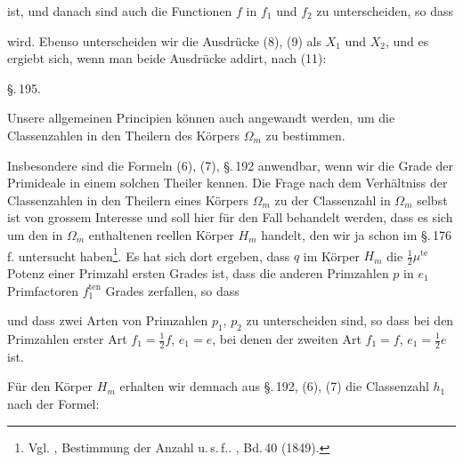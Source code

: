 ist, und danach sind auch die Functionen $f$ in $f_1$ und $f_2$ zu
unterscheiden, so dass

wird. Ebenso unterscheiden wir die Ausdrücke (8), (9) als $X_1$
und $X_2$, und es ergiebt sich, wenn man beide Ausdrücke addirt,
nach (11):

\begin{center}
\S.\,195.\\[4pt]
\end{center}

Unsere allgemeinen Principien können auch angewandt werden, um die
Classenzahlen in den Theilern des Körpers $\Omega_m$ zu bestimmen.

Insbesondere sind die Formeln (6), (7), \S.\,192 anwendbar, wenn
wir die Grade der Primideale in einem solchen Theiler kennen. Die
Frage nach dem Verhältniss der Classenzahlen in den Theilern eines
Körpers $\Omega_m$ zu der Classenzahl in $\Omega_m$ selbst ist von
grossem Interesse und soll hier für den Fall behandelt werden, dass
es sich um den in $\Omega_m$ enthaltenen reellen Körper $H_m$
handelt, den wir ja schon im \S.\,176 f. untersucht haben\footnote{Vgl.
, \glqq Bestimmung der Anzahl u.\,s.\,f.\grqq{}.
, Bd.\,40 (1849).}. Es hat sich dort ergeben, dass
$q$ im Körper $H_m$ die $\tfrac12\mu^{\text{te}}$ Potenz einer
Primzahl ersten Grades ist, dass die anderen Primzahlen $p$ in $e_1$
Primfactoren $f_1^{\text{ten}}$ Grades zerfallen, so dass

und dass zwei Arten von Primzahlen $p_1$, $p_2$ zu unterscheiden
sind, so dass bei den Primzahlen erster Art $f_1 = \tfrac12 f$,
$e_1 = e$, bei denen der zweiten Art $f_1 = f$, $e_1 = \tfrac12 e$
ist.

Für den Körper $H_m$ erhalten wir demnach aus \S.\,192, (6), (7)
die Classenzahl $h_1$ nach der Formel:
